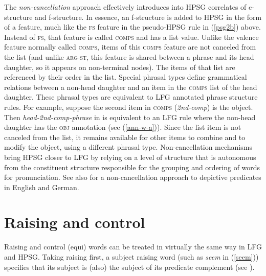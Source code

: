 The \textit{non-cancellation} approach  effectively introduces into HPSG correlates of c-structure and f-structure.  In essence, an f-structure is added to HPSG in the form of a feature, much like the \textsc{fs} feature in the pseudo-HPSG rule in (\ref{psg2b}) above.  Instead of \textsc{fs}, that feature is called \textsc{comps} and has a list value.  Unlike the valence feature normally called \textsc{comps}, items of this \textsc{comps} feature are not canceled from the list (and unlike \textsc{arg-st}, this feature is shared between a phrase and its head daughter, so it appears on non-terminal nodes).  The items of that list are referenced by their order in the list.  Special phrasal types define grammatical relations between a non-head daughter and an item in the \textsc{comps} list of the head daughter.  These phrasal types are equivalent to LFG annotated phrase structure rules.  For example, suppose the second item in \textsc{comps} (\textit{2nd-comp}) is the object.  Then \textit{head-2nd-comp-phrase} in \citet[12]{Bender2008a} is equivalent to an LFG rule where the non-head daughter has the \textsc{obj} annotation (see (\ref{ann-w-a})).  Since the list item is not canceled from the list, it remains available for other items to combine and to modify the object, using a different phrasal type.  Non-cancellation mechanisms bring HPSG closer to LFG by relying on a level of structure that is autonomous from the constituent structure  responsible for the grouping and ordering of words for pronunciation. See also  for a non-cancellation approach to depictive predicates in English and German. 


\section{Raising and control}

Raising and control (equi) words can be treated in virtually the same way in LFG and HPSG. Taking raising first, a subject raising word (such as \textit{seem} in (\ref{seem})) specifies that its subject is (also) the subject of its predicate complement (see ).  

